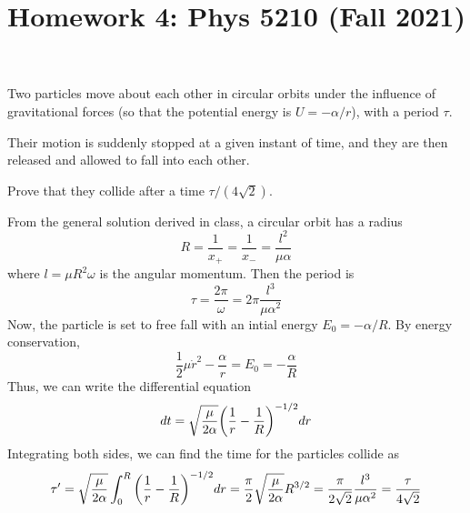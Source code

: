 \documentclass[12pt]{article}
\title{Homework 4: Phys 5210 (Fall 2021)}
\begin{document}
\maketitle

\begin{problem}{1}
Two particles move about each other in circular orbits under the influence of
gravitational forces (so that the potential energy is $U=-\alpha / r$), with a
period $\tau$.

Their motion is suddenly stopped at a given instant of time, and they are then
released and allowed to fall into each other.

Prove that they collide after a time $\tau /(4\sqrt{2})$.
\begin{solution}
From the general solution derived in class, a circular orbit has a radius
\begin{equation}
    R=\frac1{x_+}=\frac1{x_-}=\frac{l^2}{\mu\alpha} 
\end{equation}
where $l=\mu R^2\omega$ is the angular momentum. Then the period is
\begin{equation}
    \tau=\frac{2\pi}{\omega}=2\pi\frac{l^3}{\mu\alpha^2} 
\end{equation}
Now, the particle is set to free fall with an intial energy
$E_0=-\alpha /R$. By energy conservation,
\begin{equation}
    \frac12\mu\dot{r}^2-\frac{\alpha}{r}=E_0=-\frac{\alpha}{R} 
\end{equation}
Thus, we can write the differential equation
\begin{equation}
    dt=\sqrt{\frac{\mu}{2\alpha}}\qty(\frac1r-\frac1R)^{-1/2}dr
\end{equation}
Integrating both sides, we can find the time for the particles collide as
\begin{equation}
    \tau'=\sqrt{\frac{\mu}{2\alpha}}\int_0^R\qty(\frac1r-\frac1R)^{-1/2}dr 
    =\frac\pi2\sqrt{\frac{\mu}{2\alpha}}R^{3/2}=\frac\pi{2\sqrt2}\frac{l^3}{\mu\alpha^2}=\frac{\tau}{4\sqrt2}
\end{equation}
\end{solution}
\end{problem}
\end{document}
